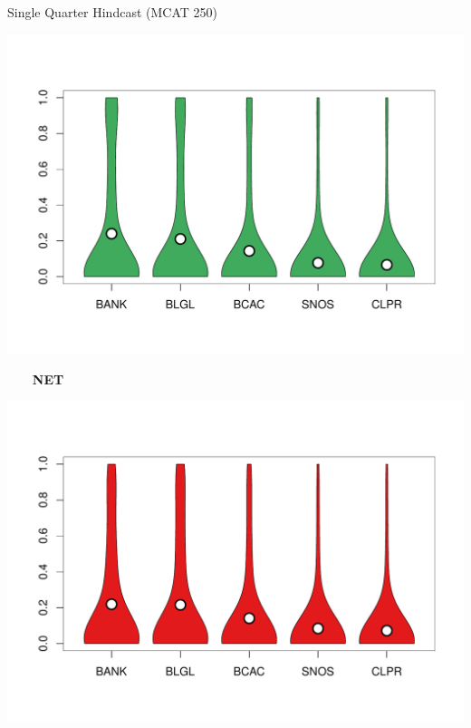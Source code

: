 \documentclass[ xcolor = pdftex, dvipsnames, table ]{beamer}
\begin{document}
\begin{frame}{Single Quarter Hindcast (MCAT 250)}
\begin{minipage}{0.29\textwidth}
\vspace*{-1.3cm}
\includegraphics[height=0.36\textheight]{../pictures/vioStarAvgOSDHKL.pdf}
\end{minipage}
\hspace*{0.5cm}
\begin{minipage}{0.29\textwidth}
\begin{center}
$~~~~~~~~~$\textbf{NET}
\end{center}
\vspace*{-0.75cm}
\includegraphics[height=0.36\textheight]{../pictures/vioStarAvgOSBNET.pdf}\\
\vspace*{-1.3cm}

\end{minipage}
\end{frame}
\end{document}
